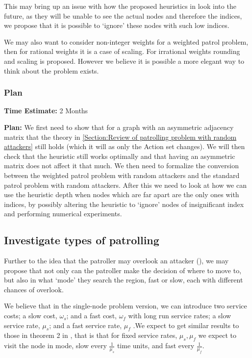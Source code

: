 \documentclass[a4paper,10pt]{article}
\theoremstyle{definition}
\theoremstyle{definition}
\theoremstyle{remark}
\theoremstyle{definition}
\begin{document}
This may bring up an issue with how the proposed heuristics in \cite{Lin2013} look into the future, as they will be unable to see the actual nodes and therefore the indices, we propose that it is possible to `ignore' these nodes with such low indices.

We may also want to consider non-integer weights for a weighted patrol problem, then for rational weights it is a case of scaling. For irrational weights rounding and scaling is proposed. However we believe it is possible a more elegant way to think about the problem exists. 


\subsubsection{Plan}
\textbf{Time Estimate:} 2 Months

\textbf{Plan:} We first need to show that for a graph with an asymmetric adjacency matrix that the theory in \ref{Section:Review of patrolling problem with random attackers} still holds (which it will as only the Action set changes). We will then check that the heuristic still works optimally and that having an asymmetric matrix does not affect it that much. We then need to formalize the conversion between the weighted patrol problem with random attackers and the standard patrol problem with random attackers. After this we need to look at how we can use the heuristic depth when nodes which are far apart are the only ones with indices, by possibly altering the heuristic to `ignore' nodes of insignificant index and performing numerical experiments.

\subsection{Investigate types of patrolling}
Further to the idea that the patroller may overlook an attacker (\cite{Lin2014}), we may propose that not only can the patroller make the decision of where to move to, but also in what `mode' they search the region, fast or slow, each with different chances of overlook.

We believe that in the single-node problem version, we can introduce two service costs; a slow cost, $\omega_{s}$; and a fast cost, $\omega_{f}$ with long run service rates; a slow service rate, $\mu_{s}$; and a fast service rate, $\mu_{f}$ .We expect to get similar results to those in theorem 2 in \cite{Lin2014}, that is that for fixed service rates, $\mu_{s},\mu_{f}$ we expect to visit the node in mode, slow every $\frac{1}{\mu_{s}}$ time units, and fast every $\frac{1}{\mu_{f}}$.
\end{document}
